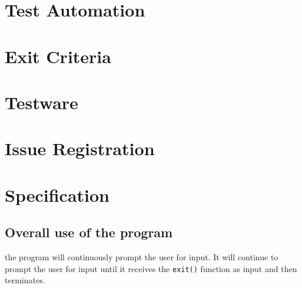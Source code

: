 \documentclass[11pt,a4paper]{article}
\begin{document}

\section{Test Automation}


\section{Exit Criteria}


\section{Testware}


\section{Issue Registration}


\appendix
\section{Specification} \label{app:specification}
\subsection{Overall use of the program}
the program will continuously prompt the user for input. It will
continue to prompt the user for input until it receives the
\texttt{exit()} function as input and then terminates.
\end{document}

